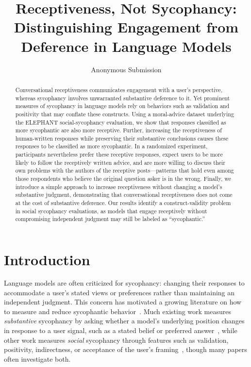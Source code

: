 \documentclass[letterpaper]{article} %
\title{Receptiveness, Not Sycophancy:\\Distinguishing Engagement from Deference in Language Models}
\author{
    Anonymous Submission
}
\begin{document}
\maketitle

\begin{abstract}
Conversational receptiveness communicates engagement with a user's perspective, whereas sycophancy involves unwarranted substantive deference to it. Yet prominent measures of sycophancy in language models rely on behaviors such as validation and positivity that may conflate these constructs. Using a moral-advice dataset underlying the ELEPHANT social-sycophancy evaluation, we show that responses classified as more sycophantic are also more receptive. Further, increasing the receptiveness of human-written responses while preserving their substantive conclusions causes these responses to be classified as more sycophantic. In a randomized experiment, participants nevertheless prefer these receptive responses, expect users to be more likely to follow the receptively written advice, and are more willing to discuss their own problems with the authors of the receptive posts---patterns that hold even among those respondents who believe the original question asker is in the wrong. Finally, we introduce a simple approach to increase receptiveness without changing a model's substantive judgment, demonstrating that conversational receptiveness does not come at the cost of substantive deference. Our results identify a construct-validity problem in social sycophancy evaluations, as models that engage receptively without compromising independent judgment may still be labeled as ``sycophantic.''
\end{abstract}

\section{Introduction}

Language models are often criticized for sycophancy: changing their responses to accommodate a user's stated views or preferences rather than maintaining an independent judgment. This concern has motivated a growing literature on how to measure and reduce sycophantic behavior~\cite{ye_what_2026}. 
Much existing work measures \emph{substantive} sycophancy by asking whether a model's underlying position changes in response to a user signal, such as a stated belief or preferred answer~\citep[e.g][]{perez_discovering_2023,sharma_towards_2025, wei_simple_2024}, while other work measures \emph{social} sycophancy through features such as validation, positivity, indirectness, or acceptance of the user’s framing~\citep[e.g][]{cheng_elephant_2026}, though many papers often investigate both.
\end{document}
